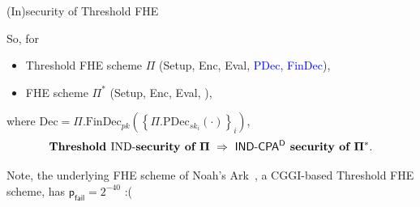\documentclass[handout]{beamer}
\begin{document}
	\begin{frame}{(In)security of Threshold FHE}

        So, for
		\begin{itemize}
			\item Threshold FHE scheme $\Pi$ (Setup, Enc, Eval, \textcolor{blue}{PDec}, \textcolor{blue}{FinDec}),
			\item FHE scheme $\Pi^*$ (Setup, Enc, Eval, ), 
		\end{itemize}
        where $\text{Dec}= \Pi.\text{FinDec}_{pk} \left(\left\{\Pi.\text{PDec}_{sk_i}(\cdot)\right\}_i\right)$, \vspace{0.3cm}
		\[\bf
            \textbf{Threshold {\normalfont IND-}security of } \Pi ~\Rightarrow~ \text{\sf IND-CPA$\sf ^D$} \textbf{ security of } \Pi^*.
        \]\vspace{0.3cm}

        Note, the underlying FHE scheme of Noah's Ark~\cite{cryptoeprint:2023/815}, a CGGI-based Threshold FHE scheme, has $\mathsf{p}_\mathsf{fail} = 2^{-40}$ :(
	\end{frame}
 



 
\end{document}

